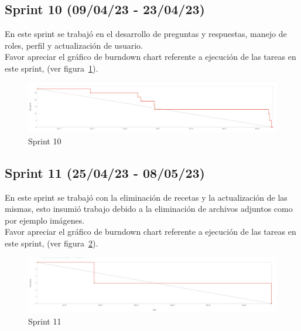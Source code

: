 \subsection{Sprint 10 (09/04/23 - 23/04/23)}\label{sprint-0-090423---230422}
En este sprint se trabajó en el desarrollo de preguntas y respuestas, manejo de roles, perfil y actualización de usuario.\\
Favor apreciar el gráfico de burndown chart referente a ejecución de las tareas en este sprint, (ver figura~\ref{Img:Sprint+10}).
\begin{figure}[h]
    \centering
    \includegraphics[width=1.0\textwidth]{img/sprint/sprint10.png}
    \caption{Sprint 10} \label{Img:Sprint+10}
\end{figure} 

\subsection{Sprint 11 (25/04/23 - 08/05/23)}\label{sprint-0-250423---080523}
En este sprint se trabajó con la eliminación de recetas y la actualización de las mismas, esto insumió trabajo debido a la eliminación de archivos adjuntos como por ejemplo imágenes.\\
Favor apreciar el gráfico de burndown chart referente a ejecución de las tareas en este sprint, (ver figura~\ref{Img:Sprint+11}).
\begin{figure}[h]
    \centering
    \includegraphics[width=1.0\textwidth]{img/sprint/sprint11.png}
    \caption{Sprint 11} \label{Img:Sprint+11}
\end{figure} 

